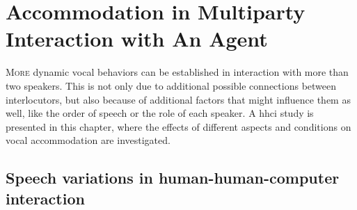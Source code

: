 \chapter{Accommodation in Multiparty Interaction with An Agent}
\label{chap:speech_variations_in_hhci}

\lettrine{M}{ore} dynamic vocal behaviors can be established in interaction with more than two speakers.
This is not only due to additional possible connections between interlocutors, but also because of additional factors that might influence them as well, like the order of speech or the role of each speaker.
A \acl{hhci} study is presented in this chapter, where the effects of different aspects and conditions on vocal accommodation are investigated.

\pagebreak

\acresetall

\section{Speech variations in human-human-computer interaction}
\label{sec:accommodation_in_multiparty_interaction_with_an_agent}

